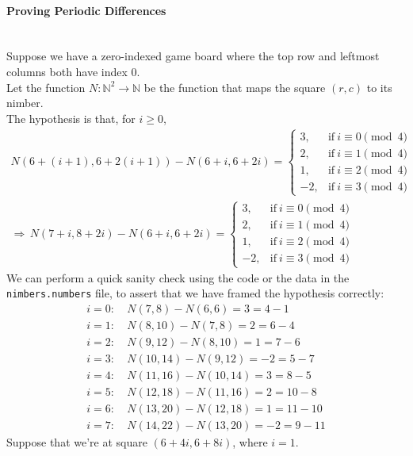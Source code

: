 \documentclass{article}
\newcommand{\N}{\mathbb{N}}
\newcommand{\R}{\Rightarrow\,}
\begin{document}
\paragraph{Proving Periodic Differences}\mbox{}\\
Suppose we have a zero-indexed game board where the top row and
leftmost columns both have index 0. \\
Let the function $N : \N^2 \rightarrow \N$ be the function that maps the
square $(r,c)$ to its nimber. \\
The hypothesis is that, for $i \geq 0$,
\begin{align*}
  N(6 + (i + 1), 6 + 2(i + 1)) - N(6 + i, 6 + 2i) =
  \begin{cases}
    3, & \text{if} \: i \equiv 0 \pmod{4} \\
    2, & \text{if} \: i \equiv 1 \pmod{4} \\
    1, & \text{if} \: i \equiv 2 \pmod{4} \\
    -2, & \text{if} \: i \equiv 3 \pmod{4}
  \end{cases} \\
  \R N(7 + i, 8 + 2i) - N(6 + i, 6 + 2i) =
  \begin{cases}
    3, & \text{if} \: i \equiv 0 \pmod{4} \\
    2, & \text{if} \: i \equiv 1 \pmod{4} \\
    1, & \text{if} \: i \equiv 2 \pmod{4} \\
    -2, & \text{if} \: i \equiv 3 \pmod{4}
  \end{cases}
\end{align*}
We can perform a quick sanity check using the code or the data in the
\verb|nimbers.numbers| file, to assert that we have framed the hypothesis
correctly:
\begin{align*}
  i = 0: &\: N( 7, 8) - N( 6, 6) = 3  = 4 - 1 \\
  i = 1: &\: N( 8,10) - N( 7, 8) = 2  = 6 - 4 \\
  i = 2: &\: N( 9,12) - N( 8,10) = 1  = 7 - 6 \\
  i = 3: &\: N(10,14) - N( 9,12) = -2 = 5 - 7 \\
  i = 4: &\: N(11,16) - N(10,14) = 3  = 8 - 5 \\
  i = 5: &\: N(12,18) - N(11,16) = 2  = 10 - 8 \\
  i = 6: &\: N(13,20) - N(12,18) = 1  = 11 - 10 \\
  i = 7: &\: N(14,22) - N(13,20) = -2 = 9 - 11
\end{align*}
Suppose that we're at square $(6 + 4i, 6 + 8i)$, where $i = 1$. \\
\end{document}
